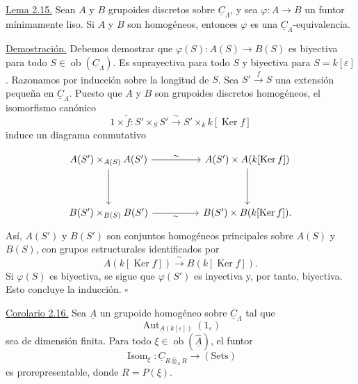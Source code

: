 \par\medskip\noindent
\underline{Lema 2.15.} Sean $A$ y $B$ grupoides discretos sobre
$\underline C_\Lambda$, y sea $\varphi:A\longrightarrow B$ un funtor
mínimamente liso. Si $A$ y $B$ son homogéneos, entonces $\varphi$ es una
$\underline C_\Lambda$-equivalencia.

\underline{Demostración.} Debemos demostrar que
$\varphi(S):A(S)\longrightarrow B(S)$ es biyectiva para todo
$S\in\operatorname{ob}(\underline C_\Lambda)$. Es suprayectiva para todo
$S$ y biyectiva para $S=k[\varepsilon]$. Razonamos por inducción sobre la
longitud de $S$. Sea $S'\xrightarrow fS$ una extensión pequeña en
$\underline C_\Lambda$. Puesto que $A$ y $B$ son grupoides discretos
homogéneos, el isomorfismo canónico
\[
 1\times\widetilde f:S'\times_SS'
 \xrightarrow{\ \sim\ }S'\times_k k[\operatorname{Ker}f]
\]
induce un diagrama conmutativo


\[
\begin{tikzcd}[column sep=huge,row sep=huge]
 A(S')\times_{A(S)}A(S') \arrow[r,"\sim"] \arrow[d]
 & A(S')\times A(k[\operatorname{Ker}f]) \arrow[d]\\
 B(S')\times_{B(S)}B(S') \arrow[r,"\sim"']
 & B(S')\times B(k[\operatorname{Ker}f]).
\end{tikzcd}
\]
Así, $A(S')$ y $B(S')$ son conjuntos homogéneos principales sobre
$A(S)$ y $B(S)$, con grupos estructurales identificados por
\[
 A(k[\operatorname{Ker}f])\xrightarrow{\ \sim\ }
 B(k[\operatorname{Ker}f]).
\]
Si $\varphi(S)$ es biyectiva, se sigue que $\varphi(S')$ es inyectiva y,
por tanto, biyectiva. Esto concluye la inducción.
\hfill$\square$

\underline{Corolario 2.16.} Sea $\underline A$ un grupoide homogéneo
sobre $\underline C_\Lambda$ tal que
\[
 \operatorname{Aut}_{\underline A(k[\varepsilon])}(1_\varepsilon)
\]
sea de dimensión finita. Para todo
$\xi\in\operatorname{ob}(\widehat{\underline A})$, el funtor
\[
 \operatorname{Isom}_\xi:
 \underline C_{R\widehat\otimes_\Lambda R}
 \longrightarrow(\mathrm{Sets})
\]
es prorepresentable, donde $R=P(\xi)$.

